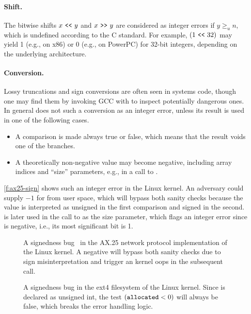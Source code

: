 \paragraph{Shift.}
The bitwise shifts $x \ \texttt{<}\texttt{<}\  y$ and $x \ \texttt{>}\texttt{>}\  y$ are considered as
integer errors if $y \geq_u n$, which is undefined according to the
C standard.  For example, $(1 \ \texttt{<}\texttt{<}\  32)$ may yield 1 (e.g., on x86)
or 0 (e.g., on PowerPC) for 32-bit integers, depending on the
underlying architecture.

\paragraph{Conversion.}
Lossy truncations and sign conversions are often seen in systems
code, though one may find them by invoking GCC with 
to inspect potentially dangerous ones.  In general \sys does not
such a conversion as an integer error, unless its result is used
in one of the following cases.
\begin{itemize}
\item
A comparison is made always true or false, which means that
the result voids one of the branches.
\item
A theoretically non-negative value may become negative, including
array indices and ``size'' parameters, e.g., in a call to
.
\end{itemize}

\autoref{f:ax25-sign} shows such an integer error in the Linux
kernel.  An adversary could supply $-1$ for  from user
space, which will bypass both sanity checks because the value is
interpreted as unsigned in the first comparison and signed in the
second.   is later used in the call to 
as the size parameter, which flags an integer error since 
is negative, i.e., its most significant bit is 1.


\begin{figure}
\centering

\vspace{-1em}
\caption{A signedness bug~\cite[CVE-2009-2909]{cve} in the AX.25
network protocol implementation of the Linux kernel.  A negative
 will bypass both sanity checks due to sign misinterpretation
 and trigger an kernel
oops in the subsequent  call.}
\label{f:ax25-sign}
\end{figure}
\begin{figure}
\centering

\vspace{-1em}
\caption{A signedness bug in the ext4 filesystem of the Linux kernel.
Since  is declared as unsigned int, the test
$(\texttt{allocated} < 0)$ will always be false, which breaks the
error handling logic.}
\label{f:ext4}
\end{figure}
\fi

